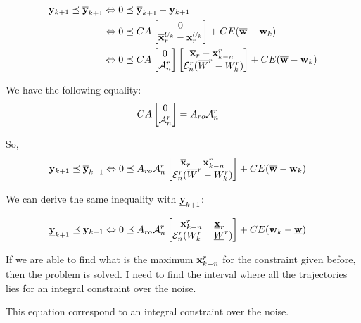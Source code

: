 \documentclass{article}
\begin{document}
\begin{align*}
\mathbf{y}_{k+1} \preceq \overline{\mathbf{y}}_{k+1}
& \Leftrightarrow
0 \preceq \overline{\mathbf{y}}_{k+1} - \mathbf{y}_{k+1} \\
& \Leftrightarrow
0 \preceq
C A \begin{bmatrix} 0 \\ \overline{\mathbf{x}}^{U_k}_r-\mathbf{x}^{U_k}_r \end{bmatrix}
+ C E (\overline{\mathbf{w}} -\mathbf{w}_k)
\\
& \Leftrightarrow
0 \preceq
C A 
\begin{bmatrix} 0 \\ \mathcal{A}^r_n \end{bmatrix} 
\begin{bmatrix}
\overline{\mathbf{x}}_r - \mathbf{x}^r_{k-n}\ \\
\mathcal{E}^r_n (\overline{W}^r - W^r_k)
\end{bmatrix}
+ C E (\overline{\mathbf{w}} -\mathbf{w}_k)
\end{align*}

We have the following equality:
\begin{align*}
C A \begin{bmatrix} 0 \\ \mathcal{A}^r_n \end{bmatrix} 
& = A_{ro} \mathcal{A}^r_n
\end{align*}

So,
\begin{align*}
\mathbf{y}_{k+1} \preceq \overline{\mathbf{y}}_{k+1}
& \Leftrightarrow
0 \preceq
A_{ro} \mathcal{A}^r_n
\begin{bmatrix}
\overline{\mathbf{x}}_r - \mathbf{x}^r_{k-n} \\
\mathcal{E}^r_n (\overline{W}^r - W^r_k)
\end{bmatrix}
+ C E (\overline{\mathbf{w}} -\mathbf{w}_k)
\end{align*}

We can derive the same inequality with $\underline{\mathbf{y}}_{k+1}$:

\begin{align*}
\underline{\mathbf{y}}_{k+1} \preceq \mathbf{y}_{k+1}
& \Leftrightarrow
0 \preceq
A_{ro} \mathcal{A}^r_n
\begin{bmatrix}
\mathbf{x}^r_{k-n} - \underline{\mathbf{x}}_r \\
\mathcal{E}^r_n (W^r_k - \underline{W}^r)
\end{bmatrix}
+ C E (\mathbf{w}_k - \underline{\mathbf{w}})
\end{align*}

If we are able to find what is the maximum $\mathbf{x}^r_{k-n}$ for the constraint given before, then the problem is solved. I need to find the interval where all the trajectories lies for an integral constraint over the noise.

This equation correspond to an integral constraint over the noise.
\end{document}
